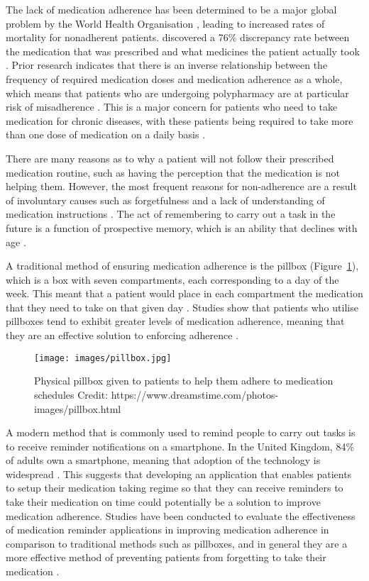 \documentclass{l4proj}
\begin{document}
The lack of medication adherence has been determined to be a major global problem by the World Health Organisation \citep{sabate2003adherence}, leading to increased rates of mortality for nonadherent patients. \cite{bedell2000discrepancies} discovered a 76\% discrepancy rate between the medication that was prescribed and what medicines the patient actually took . Prior research indicates that there is an inverse relationship between the frequency of required medication doses and medication adherence as a whole, which means that patients who are undergoing polypharmacy are at particular risk of misadherence \citep{pasina2014medication}. This is a major concern for patients who need to take medication for chronic diseases, with these patients being required to take more than one dose of medication on a daily basis \citep{saini2009effect}. 

There are many reasons as to why a patient will not follow their prescribed medication routine, such as having the perception that the medication is not helping them. However, the most frequent reasons for non-adherence are a result of involuntary causes such as forgetfulness and a lack of understanding of medication instructions \citep{perez2019mobile}. The act of remembering to carry out a task in the future is a function of prospective memory, which is an ability that declines with age \citep{maylor1990age, Zogg2011TheRO}. 

A traditional method of ensuring medication adherence is the pillbox (Figure~\ref{fig:pillbox}), which is a box with seven compartments, each corresponding to a day of the week. This meant that a patient would place in each compartment the medication that they need to take on that given day \citep{schwartz2017pillbox}. Studies show that patients who utilise pillboxes tend to exhibit greater levels of medication adherence, meaning that they are an effective solution to enforcing adherence \citep{e2013descriptive}. 

\begin{figure}[!ht]
    \centering
    \texttt{[image: images/pillbox.jpg]}
    \caption{Physical pillbox given to patients to help them adhere to medication schedules
        \newline Credit: https://www.dreamstime.com/photos-images/pillbox.html}

    \label{fig:pillbox}
\end{figure}

A modern method that is commonly used to remind people to carry out tasks is to receive reminder notifications on a smartphone. In the United Kingdom, 84\% of adults own a smartphone, meaning that adoption of the technology is widespread \citep{matthewboyler}. This suggests that developing an application that enables patients to setup their medication taking regime so that they can receive reminders to take their medication on time could potentially be a solution to improve medication adherence. Studies have been conducted to evaluate the effectiveness of medication reminder applications in improving medication adherence in comparison to traditional methods such as pillboxes, and in general they are a more effective method of preventing patients from forgetting to take their medication \citep{perez2019mobile}.
\end{document}
